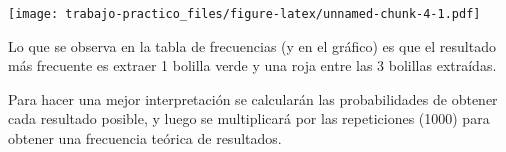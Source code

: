 \documentclass[
]{article}
\newenvironment{Shaded}{\begin{snugshade}}{\end{snugshade}}
\newcommand{\AttributeTok}[1]{\textcolor[rgb]{0.77,0.63,0.00}{#1}}
\newcommand{\FloatTok}[1]{\textcolor[rgb]{0.00,0.00,0.81}{#1}}
\newcommand{\FunctionTok}[1]{\textcolor[rgb]{0.00,0.00,0.00}{#1}}
\newcommand{\NormalTok}[1]{#1}
\newcommand{\SpecialCharTok}[1]{\textcolor[rgb]{0.00,0.00,0.00}{#1}}
\newcommand{\StringTok}[1]{\textcolor[rgb]{0.31,0.60,0.02}{#1}}
\begin{document}
\begin{Shaded}
\end{Shaded}

\texttt{[image: trabajo-practico\_files/figure-latex/unnamed-chunk-4-1.pdf]}

Lo que se observa en la tabla de frecuencias (y en el gráfico) es que el
resultado más frecuente es extraer 1 bolilla verde y una roja entre las
3 bolillas extraídas.

Para hacer una mejor interpretación se calcularán las probabilidades de
obtener cada resultado posible, y luego se multiplicará por las
repeticiones (1000) para obtener una frecuencia teórica de resultados.
\end{document}
